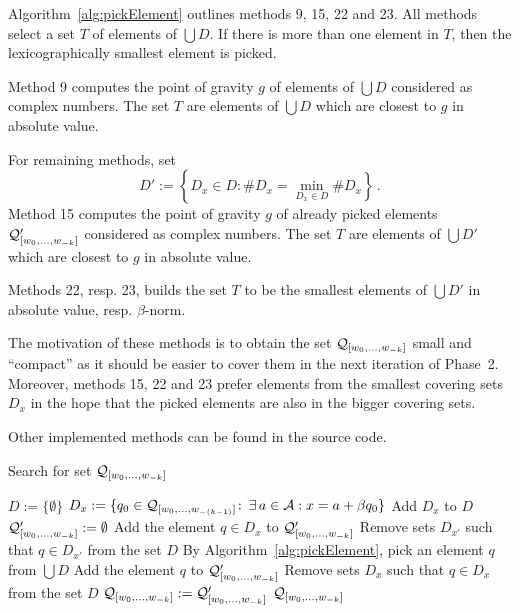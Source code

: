 Algorithm~\ref{alg:pickElement} outlines methods 9, 15, 22 and 23. All methods select a set $T$ of elements of $\bigcup D$. If there is more than one element in $T$, then the lexicographically smallest element is picked.

Method 9 computes the point of gravity $g$ of elements of $\bigcup D$ considered as complex numbers. The set $T$ are elements of  $\bigcup D$ which are closest to $g$ in absolute value. 

For remaining methods, set
$$D':=\left\{D_x \in D \colon \#D_x=\min_{D_x\in D} \#D_x \right\}\,.$$
Method 15 computes the point of gravity $g$ of already picked elements $\mathcal{Q}_{[w_{0}, \dots, w_{-k}]}'$ considered as complex numbers. The set $T$ are elements of  $\bigcup D'$ which are closest to $g$ in absolute value. 

Methods 22, resp. 23, builds the set $T$ to be the smallest elements of  $\bigcup D'$ in absolute value, resp.  $\beta$-norm. 

The motivation of these methods is to obtain the set $\mathcal{Q}_{[w_{0}, \dots, w_{-k}]}$ small and ``compact'' as it should be easier to cover them in the next iteration of Phase~2. Moreover, methods 15, 22 and 23 prefer elements from the smallest covering sets $D_x$ in the hope that the picked elements are also in the bigger covering sets.

Other implemented methods can be found in the source code. 

\begin{algorithm}
  \caption{Search for set $\mathcal{Q}_{[w_{0}, \dots, w_{-k}]}$ }
    \label{alg:minimalSet}
  \begin{algorithmic}[1]
    \STATE $D:=\{\emptyset\}$
    	\STATE $D_x:= \{q_0\in\mathcal{Q}_{[w_{0}, \dots, w_{-(k-1)}]}\colon\, \exists \, a\in\mathcal{A}: x=a+\beta q_0 \}$
        \STATE Add $D_x$ to $D$
    \ENDFOR
    \STATE $\mathcal{Q}_{[w_{0}, \dots, w_{-k}]}':=\emptyset$
    		\STATE Add the element $q\in D_x$ to $\mathcal{Q}_{[w_{0}, \dots, w_{-k}]}'$
	        \STATE Remove sets $D_{x'}$ such that $q \in D_{x'}$  from the set $D$ 
	    \ENDIF
	\ENDFOR
        \STATE By Algorithm~\ref{alg:pickElement},  pick an element $q$ from $\bigcup D$
        \STATE Add the element $q$ to $\mathcal{Q}_{[w_{0}, \dots, w_{-k}]}'$
        \STATE Remove sets $D_x$ such that $q \in D_x$  from the set $D$ 
    \ENDWHILE
	\STATE $\mathcal{Q}_{[w_{0}, \dots, w_{-k}]}:=\mathcal{Q}_{[w_{0}, \dots, w_{-k}]}'$
    \RETURN $\mathcal{Q}_{[w_{0}, \dots, w_{-k}]}$
  \end{algorithmic}
\end{algorithm}


